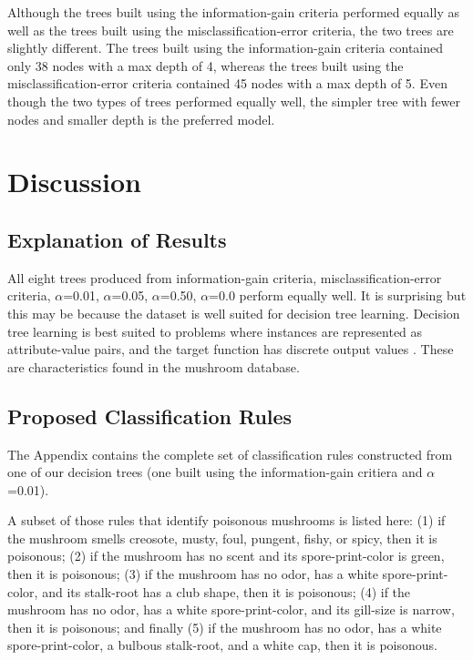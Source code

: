 \documentclass{IEEEtran}
\begin{document}
Although the trees built using the information-gain criteria performed
equally as well as the trees built using the misclassification-error
criteria, the two trees are slightly different. The trees built using
the information-gain criteria contained only 38 nodes with a max depth
of 4, whereas the trees built using the misclassification-error
criteria contained 45 nodes with a max depth of 5. Even though the two
types of trees performed equally well, the simpler tree with fewer
nodes and smaller depth is the preferred model.

\section{Discussion}
\subsection{Explanation of Results}
All eight trees produced from information-gain criteria,
misclassification-error criteria, $\alpha$=0.01, $\alpha$=0.05, $\alpha$=0.50,
$\alpha$=0.0 perform equally well. It is surprising but this may be because
the dataset is well suited for decision tree learning. Decision tree
learning is best suited to problems where instances are represented as
attribute-value pairs, and the target function has discrete output
values \parencite{mitchell1997machine}. These are characteristics
found in the mushroom database.

\subsection{Proposed Classification Rules}
The Appendix contains the complete set of classification rules
constructed from one of our decision trees (one built using the
information-gain critiera and $\alpha$=0.01). 

A subset of those rules that identify poisonous mushrooms is listed
here: (1) if the mushroom smells creosote, musty, foul, pungent,
fishy, or spicy, then it is poisonous; (2) if the mushroom has no
scent and its spore-print-color is green, then it is poisonous; (3) if
the mushroom has no odor, has a white spore-print-color, and its
stalk-root has a club shape, then it is poisonous; (4) if the mushroom
has no odor, has a white spore-print-color, and its gill-size is
narrow, then it is poisonous; and finally (5) if the mushroom has no
odor, has a white spore-print-color, a bulbous stalk-root, and a white
cap, then it is poisonous. 
\end{document}
